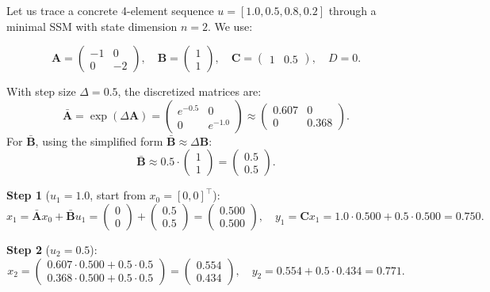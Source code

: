 \begin{example}
Let us trace a concrete 4-element sequence $u = [1.0, 0.5, 0.8, 0.2]$ through a minimal SSM with state dimension $n=2$. We use:

\[
\mathbf{A} = \begin{pmatrix} -1 & 0 \\ 0 & -2 \end{pmatrix}, \quad \mathbf{B} = \begin{pmatrix} 1 \\ 1 \end{pmatrix}, \quad \mathbf{C} = \begin{pmatrix} 1 & 0.5 \end{pmatrix}, \quad D = 0.
\]

With step size $\Delta = 0.5$, the discretized matrices are:
\[
\bar{\mathbf{A}} = \exp(\Delta \mathbf{A}) = \begin{pmatrix} e^{-0.5} & 0 \\ 0 & e^{-1.0} \end{pmatrix} \approx \begin{pmatrix} 0.607 & 0 \\ 0 & 0.368 \end{pmatrix}.
\]
For $\bar{\mathbf{B}}$, using the simplified form $\bar{\mathbf{B}} \approx \Delta \mathbf{B}$:
\[
\bar{\mathbf{B}} \approx 0.5 \cdot \begin{pmatrix} 1 \\ 1 \end{pmatrix} = \begin{pmatrix} 0.5 \\ 0.5 \end{pmatrix}.
\]

\textbf{Step 1} ($u_1 = 1.0$, start from $x_0 = [0, 0]^\top$):
\[
x_1 = \bar{\mathbf{A}} x_0 + \bar{\mathbf{B}} u_1 = \begin{pmatrix}0\\0\end{pmatrix} + \begin{pmatrix}0.5\\0.5\end{pmatrix} = \begin{pmatrix}0.500\\0.500\end{pmatrix}, \quad y_1 = \mathbf{C} x_1 = 1.0 \cdot 0.500 + 0.5 \cdot 0.500 = \mathbf{0.750}.
\]

\textbf{Step 2} ($u_2 = 0.5$):
\[
x_2 = \begin{pmatrix}0.607 \cdot 0.500 + 0.5 \cdot 0.5\\0.368 \cdot 0.500 + 0.5 \cdot 0.5\end{pmatrix} = \begin{pmatrix}0.554\\0.434\end{pmatrix}, \quad y_2 = 0.554 + 0.5 \cdot 0.434 = \mathbf{0.771}.
\]


\end{example}
